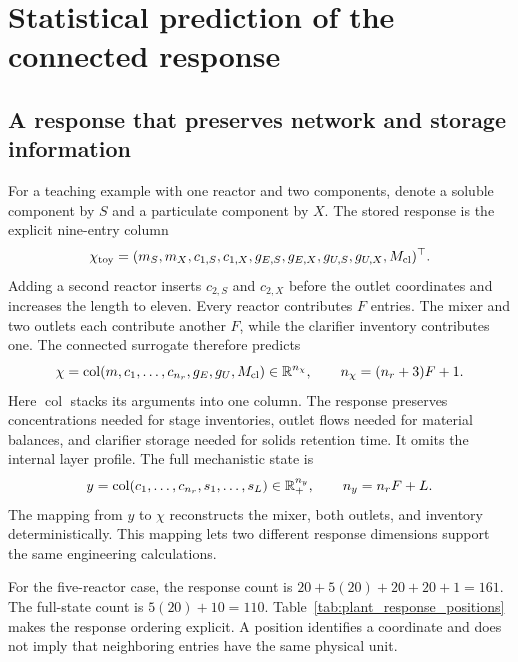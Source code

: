\section{Statistical prediction of the connected response}

\subsection{A response that preserves network and storage information}

For a teaching example with one reactor and two components, denote a soluble component by $S$ and a particulate component by $X$. The stored response is the explicit nine-entry column
\begin{equation}
\equationname{Illustrative joint response of a one-stage, two-component plant}
\chi_{\rm toy}=
(m_S,m_X,c_{1,S},c_{1,X},g_{E,S},g_{E,X},g_{U,S},g_{U,X},M_{\rm cl})^\top.
\end{equation}
Adding a second reactor inserts $c_{2,S}$ and $c_{2,X}$ before the outlet coordinates and increases the length to eleven. Every reactor contributes $F$ entries. The mixer and two outlets each contribute another $F$, while the clarifier inventory contributes one. The connected surrogate therefore predicts
\begin{equation}
\equationname{Complete joint plant-response vector and its dimension}
\chi=\operatorname{col}(m,c_1,\ldots,c_{n_r},g_E,g_U,M_{\rm cl})
\in\mathbb R^{n_\chi},\qquad n_\chi=(n_r+3)F+1.
\label{eq:plant_joint_response}
\end{equation}
Here $\operatorname{col}$ stacks its arguments into one column. The response preserves concentrations needed for stage inventories, outlet flows needed for material balances, and clarifier storage needed for solids retention time. It omits the internal layer profile. The full mechanistic state is
\begin{equation}
\equationname{Mechanistic reactor-and-clarifier state vector and its dimension}
y=\operatorname{col}(c_1,\ldots,c_{n_r},s_1,\ldots,s_L)
\in\mathbb R_+^{n_y},\qquad n_y=n_rF+L.
\label{eq:plant_mechanistic_state}
\end{equation}
The mapping from $y$ to $\chi$ reconstructs the mixer, both outlets, and inventory deterministically. This mapping lets two different response dimensions support the same engineering calculations.

For the five-reactor case, the response count is $20+5(20)+20+20+1=161$. The full-state count is $5(20)+10=110$. Table~\ref{tab:plant_response_positions} makes the response ordering explicit. A position identifies a coordinate and does not imply that neighboring entries have the same physical unit.

